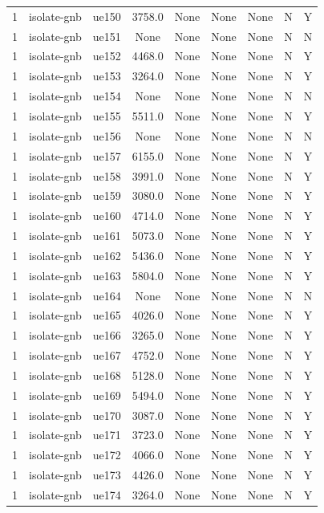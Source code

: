 \begin{table}[ht]
\begin{tabular}{|c|c|c|c|c|c|c|c|c|}
1 & isolate-gnb & ue150 & 3758.0 & None & None & None & N & Y \\
1 & isolate-gnb & ue151 & None & None & None & None & N & N \\
1 & isolate-gnb & ue152 & 4468.0 & None & None & None & N & Y \\
1 & isolate-gnb & ue153 & 3264.0 & None & None & None & N & Y \\
1 & isolate-gnb & ue154 & None & None & None & None & N & N \\
1 & isolate-gnb & ue155 & 5511.0 & None & None & None & N & Y \\
1 & isolate-gnb & ue156 & None & None & None & None & N & N \\
1 & isolate-gnb & ue157 & 6155.0 & None & None & None & N & Y \\
1 & isolate-gnb & ue158 & 3991.0 & None & None & None & N & Y \\
1 & isolate-gnb & ue159 & 3080.0 & None & None & None & N & Y \\
1 & isolate-gnb & ue160 & 4714.0 & None & None & None & N & Y \\
1 & isolate-gnb & ue161 & 5073.0 & None & None & None & N & Y \\
1 & isolate-gnb & ue162 & 5436.0 & None & None & None & N & Y \\
1 & isolate-gnb & ue163 & 5804.0 & None & None & None & N & Y \\
1 & isolate-gnb & ue164 & None & None & None & None & N & N \\
1 & isolate-gnb & ue165 & 4026.0 & None & None & None & N & Y \\
1 & isolate-gnb & ue166 & 3265.0 & None & None & None & N & Y \\
1 & isolate-gnb & ue167 & 4752.0 & None & None & None & N & Y \\
1 & isolate-gnb & ue168 & 5128.0 & None & None & None & N & Y \\
1 & isolate-gnb & ue169 & 5494.0 & None & None & None & N & Y \\
1 & isolate-gnb & ue170 & 3087.0 & None & None & None & N & Y \\
1 & isolate-gnb & ue171 & 3723.0 & None & None & None & N & Y \\
1 & isolate-gnb & ue172 & 4066.0 & None & None & None & N & Y \\
1 & isolate-gnb & ue173 & 4426.0 & None & None & None & N & Y \\
1 & isolate-gnb & ue174 & 3264.0 & None & None & None & N & Y \\

\end{tabular}
\end{table}
